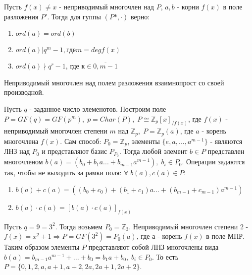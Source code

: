 \begin{sledsv}
  Пусть $f(x) \neq x$ - неприводимый многочлен над $P$, $a,b$ - корни $f(x)$ в поле разложения $P'$. Тогда для гуппы $(P*,\cdot)$ верно:
  \begin{enumerate}
        \item $ord(a) = ord(b)$
        \item $ord(a) | q^m - 1, где m = degf(x)$
        \item $ord(a) \nmid  q^r - 1$, где $к \in \overline{0,m-1}$
    \end{enumerate}
\end{sledsv}

\begin{sledsv}
  Неприводимый многочлен над полем разложения взаимнопрост со своей производной.
\end{sledsv}


Пусть $q$ - заданное число элеменотов. Построим поле $P = GF(q) = GF(p^m),\; p = Char(P),\; P \cong \mathbb{Z}_p[x]_{/f(x)}$, где $f(x)$ - неприводимый многочлен степени $m$ над $\mathbb{Z}_p,\;
P = \mathbb{Z}_p(a)$, где $a$ - корень многочлена $f(x)$. Сам способ: $P_0 = \mathbb{Z}_p$, элементы $\{e, a, ... , a^{m-1}\}$ - являются ЛНЗ
над $P_0$ и представляют базис $P_{P_0}$. Тогда любой элемент $b \in P$ представлен многочленом $b(a) = (b_0 + b_1a... + b_{m-1}a^{m-1}),\; b_i \in P_0$.
Операции задаются так, чтобы не выходить за рамки поля: $\forall\; b(a),c(a) \in P$: 
    \begin{enumerate}
        \item $b(a) + c(a) = ((b_0+c_0) + (b_1+c_1)a... + (b_{m-1}+c_{m-1})a^{m-1})$
        \item $b(a) \cdot c(a) = [b(a) \cdot c(a)]_{f(x)}$
    \end{enumerate}

\begin{example}
    Пусть $q = 9 = 3^2$. Тогда возьмем $P_0 = \mathbb{Z}_3$. Неприводимый многочлен степени 2 - $f(x) = x^2 + 1 \Rightarrow P = GF(3^2) = P_0(a)$, где $а$ - корень $f(x)$ в поле МПР. 
    Таким образом элементы $P$ представляют собой ЛНЗ многочлены вида $b(a) = b_{m-1}a^{m-1} + ... + b_0 = b_1a + b_0,\; b_i \in P_0$. То есть $P  = \{0, 1, 2, a, a+1, a+2, 2a, 2a+1, 2a+2\}$.
\end{example}

\newpage
